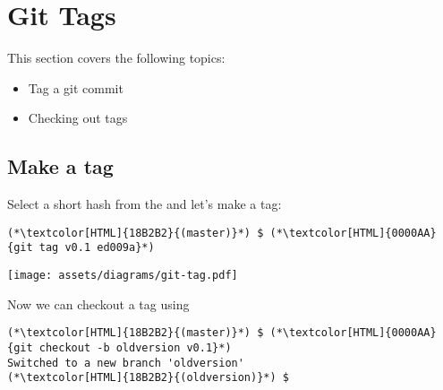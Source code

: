 \section{Git Tags}
\begin{frame}[fragile]
  \slidetitle

  This section covers the following topics:
  \begin{itemize}
    \item Tag a git commit
    \item Checking out tags
  \end{itemize}
\end{frame}

\subsection{Make a tag}
\begin{frame}[fragile]
  \subslidetitle

  Select a short hash from the  and let's make a tag:
  \begin{lstlisting}
(*\textcolor[HTML]{18B2B2}{(master)}*) $ (*\textcolor[HTML]{0000AA}{git tag v0.1 ed009a}*)
\end{lstlisting}
  \centerline{\texttt{[image: assets/diagrams/git-tag.pdf]}}

  \vspace{1em}
  Now we can checkout a tag using 
  \begin{lstlisting}
(*\textcolor[HTML]{18B2B2}{(master)}*) $ (*\textcolor[HTML]{0000AA}{git checkout -b oldversion v0.1}*)
Switched to a new branch 'oldversion'
(*\textcolor[HTML]{18B2B2}{(oldversion)}*) $
\end{lstlisting}

\end{frame}

